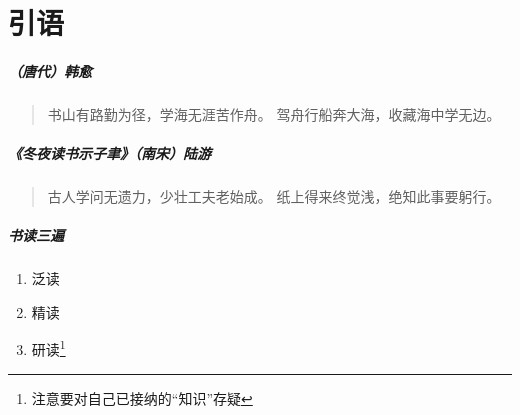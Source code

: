 \chapter{引语}

\paragraph{（唐代）韩愈}
\begin{quote}
  书山有路勤为径，学海无涯苦作舟。\newline
  驾舟行船奔大海，收藏海中学无边。
\end{quote}

\paragraph{《冬夜读书示子聿》（南宋）陆游}
\begin{quote}
  古人学问无遗力，少壮工夫老始成。\newline
  纸上得来终觉浅，绝知此事要躬行。
\end{quote}

\paragraph{书读三遍}
\begin{enumerate}
  \item 泛读
  \item 精读
  \item 研读\footnote{注意要对自己已接纳的“知识”存疑}
\end{enumerate}
